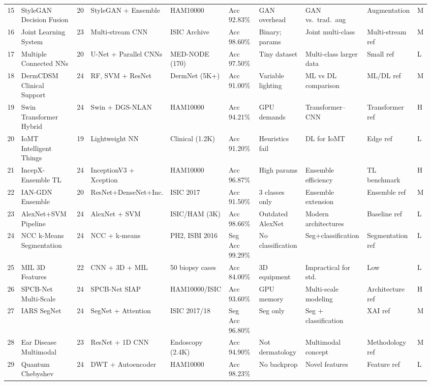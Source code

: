 \documentclass[11pt,a4paper]{article}
\begin{document}
\begin{landscape}
{\begin{longtable}{C{0.4cm} L{3cm} C{0.5cm} L{2.2cm} L{2.2cm} L{1.7cm} L{2cm} L{2.2cm} L{2.2cm} C{0.8cm}}
15 & StyleGAN Decision Fusion & 20 & StyleGAN + Ensemble & HAM10000 & Acc 92.83\% & GAN overhead & GAN vs.\ trad.\ aug & Augmentation & M \\
16 & Joint Learning System & 23 & Multi-stream CNN & ISIC Archive & Acc 98.60\% & Binary; params & Joint multi-class & Multi-stream ref & M \\
17 & Multiple Connected NNs & 20 & U-Net + Parallel CNNs & MED-NODE (170) & Acc 97.50\% & Tiny dataset & Multi-class larger data & Small ref & L \\
18 & DermCDSM Clinical Support & 24 & RF, SVM + ResNet & DermNet (5K+) & Acc 91.00\% & Variable lighting & ML vs DL comparison & ML/DL ref & M \\
19 & Swin Transformer Hybrid & 24 & Swin + DGS-NLAN & HAM10000 & Acc 94.21\% & GPU demands & Transformer--CNN & Transformer ref & H \\
20 & IoMT Intelligent Things & 19 & Lightweight NN & Clinical (1.2K) & Acc 91.20\% & Heuristics fail & DL for IoMT & Edge ref & L \\
21 & IncepX-Ensemble TL & 24 & InceptionV3 + Xception & HAM10000 & Acc 96.87\% & High params & Ensemble efficiency & TL benchmark & H \\
22 & IAN-GDN Ensemble & 20 & ResNet+DenseNet+Inc. & ISIC 2017 & Acc 91.50\% & 3 classes only & Ensemble extension & Ensemble ref & M \\
23 & AlexNet+SVM Pipeline & 24 & AlexNet + SVM & ISIC/HAM (3K) & Acc 98.66\% & Outdated AlexNet & Modern architectures & Baseline ref & L \\
24 & NCC k-Means Segmentation & 24 & NCC + k-means & PH2, ISBI 2016 & Seg Acc 99.29\% & No classification & Seg+classification & Segmentation ref & L \\
25 & MIL 3D Features & 22 & CNN + 3D + MIL & 50 biopsy cases & Acc 84.00\% & 3D equipment & Impractical for std. & Low & L \\
26 & SPCB-Net Multi-Scale & 24 & SPCB-Net SIAP & HAM10000/ISIC & Acc 93.60\% & GPU memory & Multi-scale modeling & Architecture ref & H \\
27 & IARS SegNet & 24 & SegNet + Attention & ISIC 2017/18 & Seg Acc 96.80\% & Seg only & Seg + classification & XAI ref & M \\
28 & Ear Disease Multimodal & 23 & ResNet + 1D CNN & Endoscopy (2.4K) & Acc 94.90\% & Not dermatology & Multimodal concept & Methodology ref & M \\
29 & Quantum Chebyshev & 24 & DWT + Autoencoder & HAM10000 & Acc 98.23\% & No backprop & Novel features & Feature ref & L \\

\end{longtable}}
\end{landscape}
\end{document}
